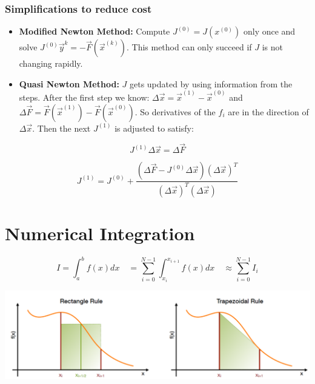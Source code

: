 \documentclass[8pt,a4paper]{scrartcl}
\begin{document}
\begin{multicols*}{3}
\subsubsection{Simplifications to reduce cost}

\begin{itemize}
\item \textbf{Modified Newton Method:} Compute $J^{(0)} = J(x^{(0)})$ only once and solve $J^{(0)} \vec y^k = - \vec F (\vec x^{(k)})$. This method can only succeed if $J$ is not changing rapidly.
\item \textbf{Quasi Newton Method:} $J$ gets updated by using information from the steps. After the first step we know: $\Delta \vec x = \vec x^{(1)} - \vec x^{(0)}$ and $\Delta \vec F = \vec F (\vec x^{(1)}) - \vec F (\vec x^{(0)})$. So derivatives of the $f_i$ are in the direction of $\Delta \vec x$. Then the next $J^{(1)}$ is adjusted to satisfy:
\end{itemize}

\begin{equation*}
J^{(1)} \Delta \vec x = \Delta \vec F
\end{equation*}

\begin{equation*}
J^{(1)} = J^{(0)} + \frac{(\Delta \vec F - J^{(0)} \Delta \vec x)(\Delta \vec x)^T}{(\Delta \vec x )^T (\Delta \vec x )}
\end{equation*}


\section{Numerical Integration}


\begin{equation*}
I = \int_a^b f(x) dx \quad = \sum_{i=0}^{N-1} \int_{x_i}^{x_{i+1}} f(x) dx \quad \approx \sum_{i=0}^{N-1} I_i
\end{equation*}

\begin{center}\includegraphics[width=0.9\linewidth]{RectangleTrapezoidalRule}\end{center}


\end{multicols*}
\end{document}
